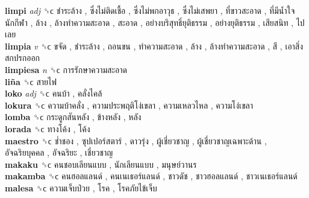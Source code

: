 \textbf{limpi} \emph{adj}  ␝ϲ   ชำระล้าง ,  ซึ่งไม่ติดเชื้อ ,  ซึ่งไม่พกอาวุธ ,  ซึ่งไม่เสพยา ,  ที่ขาวสะอาด ,  ที่มีน้ำใจนักกีฬา ,  ล้าง ,  ล้างทำความสะอาด ,  สะอาด ,  อย่างบริสุทธิ์ยุติธรรม ,  อย่างยุติธรรม ,  เสียสนิท ,  ไปเลย   \\
\textbf{limpia} \emph{v}  ␝ϲ   ขจัด ,  ชำระล้าง ,  ถอนขน ,  ทำความสะอาด ,  ล้าง ,  ล้างทำความสะอาด ,  สี ,  เอาสิ่งสกปรกออก   \\
\textbf{limpiesa} \emph{n}  ␝ϲ   การรักษาความสะอาด   \\
\textbf{liña} ␝ϲ   สายไฟ   \\
\textbf{loko} \emph{adj}  ␝ϲ   คนบ้า ,  คลั่งไคล้   \\
\textbf{lokura} ␝ϲ   ความบ้าคลั่ง ,  ความประพฤติโง่เขลา ,  ความเหลวไหล ,  ความโง่เขลา   \\
\textbf{lomba} ␝ϲ   กระดูกสันหลัง ,  ข้างหลัง ,  หลัง   \\
\textbf{lorada} ␝ϲ   ทางโค้ง ,  โค้ง   \\
\textbf{maestro} ␝ϲ   ช่ำชอง ,  ซุปเปอร์สตาร์ ,  ดาวรุ่ง ,  ผู้เชี่ยวชาญ ,  ผู้เชี่ยวชาญเฉพาะด้าน ,  อัจฉริยบุคคล ,  อัจฉริยะ ,  เชี่ยวชาญ   \\
\textbf{makaku} ␝ϲ   คนชอบเลียนแบบ ,  นักเลียนแบบ ,  มนุษย์วานร   \\
\textbf{makamba} ␝ϲ   คนฮอลแลนด์ ,  คนเนเธอร์แลนด์ ,  ชาวดัช ,  ชาวฮอลแลนด์ ,  ชาวเนเธอร์แลนด์   \\
\textbf{malesa} ␝ϲ   ความเจ็บป่วย ,  โรค ,  โรคภัยไข้เจ็บ   \\
